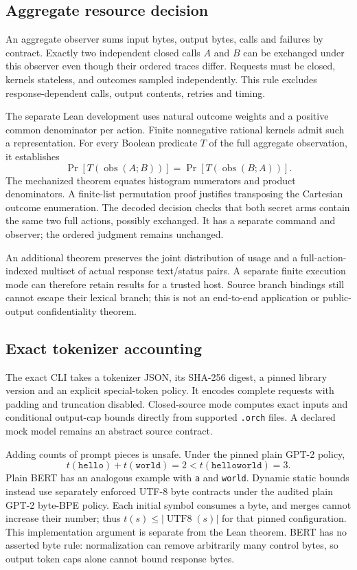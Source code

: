 \documentclass[preprint,12pt,a4paper]{elsarticle}
\begin{document}
\subsection{Aggregate resource decision}
An aggregate observer sums input bytes, output bytes, calls and failures by
contract. Exactly two independent closed calls $A$ and $B$ can be exchanged
under this observer even though their ordered traces differ. Requests must be
closed, kernels stateless, and outcomes sampled independently. This rule
excludes response-dependent calls, output contents, retries and timing.

The separate Lean development uses natural outcome weights and a positive
common denominator per action. Finite nonnegative rational kernels admit such
a representation. For every Boolean predicate $T$ of the full aggregate
observation, it establishes
\[
 \Pr[T(\operatorname{obs}(A;B))]
 =\Pr[T(\operatorname{obs}(B;A))].
\]
The mechanized theorem equates histogram numerators and product denominators.
A finite-list permutation proof justifies transposing the Cartesian outcome
enumeration. The decoded decision checks that both secret arms contain the
same two full actions, possibly exchanged. It has a separate command and
observer; the ordered judgment remains unchanged.

An additional theorem preserves the joint distribution of usage and a
full-action-indexed multiset of actual response text/status pairs. A separate
finite execution mode can therefore retain results for a trusted host.
Source branch bindings still cannot escape their lexical branch; this is
not an end-to-end application or public-output confidentiality theorem.

\subsection{Exact tokenizer accounting}
The exact CLI takes a tokenizer JSON, its SHA-256 digest, a pinned library
version and an explicit special-token policy. It encodes complete requests
with padding and truncation disabled. Closed-source mode computes exact
inputs and conditional output-cap bounds directly from supported
\texttt{.orch} files. A declared mock model remains an abstract source contract.

Adding counts of prompt pieces is unsafe. Under the pinned plain GPT-2 policy,
\[
 t(\texttt{hello})+t(\texttt{world})=2
 <t(\texttt{helloworld})=3.
\]
Plain BERT has an analogous example with \texttt{a} and \texttt{world}.
Dynamic static bounds instead use separately enforced UTF-8 byte contracts
under the audited plain GPT-2 byte-BPE policy. Each initial symbol consumes a
byte, and merges cannot increase their number; thus
$t(s)\leq|\operatorname{UTF8}(s)|$ for that pinned configuration.
This implementation argument is separate from the Lean theorem.
BERT has no asserted byte rule: normalization can remove arbitrarily many
control bytes, so output token caps alone cannot bound response bytes.
\end{document}
